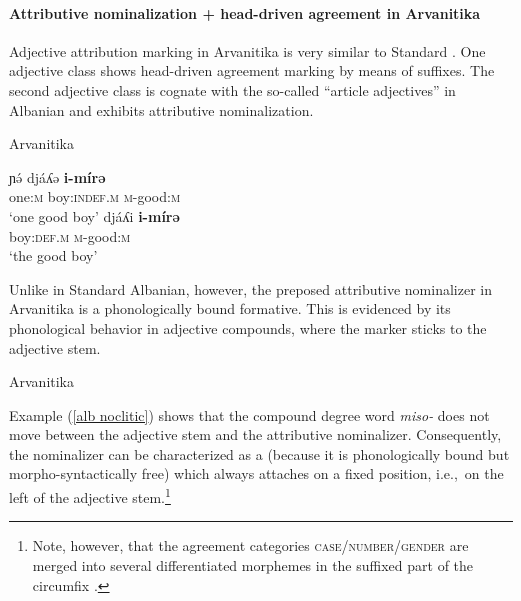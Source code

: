 \paragraph*{Attributive nominalization + head\hyp{}driven agreement in Arvanitika}
Adjective attribution marking in Arvanitika is very similar to Standard . One adjective class shows head\hyp{}driven agreement marking by means of suffixes. The second adjective class is cognate with the so-called “article adjectives” in Albanian and exhibits attributive nominalization. 
\begin{exe}
\ex \rm{Arvanitika \citep[303]{sasse1991}}
\begin{xlist}
\ex
\gll	ɲə́ 			djáʎə 			\textbf{i-mírə}\\
	one:\textsc{m} 	boy:\textsc{indef.m} 	\textsc{m}-good:\textsc{m}\\
\glt	‘one good boy’
\ex
\gll				djáʎi 				\textbf{i-mírə}\\
				boy:\textsc{def.m} 	\textsc{m}-good:\textsc{m}\\
\glt	‘the good boy’
\end{xlist}
\end{exe}
Unlike in Standard Albanian, however, the preposed attributive nominalizer in Arvanitika is a phonologically bound formative. This is evidenced by its phonological behavior in adjective compounds, where the marker sticks to the adjective stem.
\begin{exe}
\label{alb noclitic}
\ex \rm{Arvanitika \citep[304]{sasse1991}}
\begin{xlist}
\end{xlist}
\end{exe}
Example (\ref{alb noclitic}) shows that the compound degree word \textit{miso-} does not move between the adjective stem and the attributive nominalizer. Consequently, the nominalizer can be characterized as a  (because it is phonologically bound but morpho-syntactically free) which always attaches on a fixed position, i.e.,~on the left of the adjective stem.\footnote{Note, however, that the agreement categories \textsc{case/number/gender} are merged into several differentiated morphemes in the suffixed part of the circumfix \cite[124–128]{sasse1991}.}

